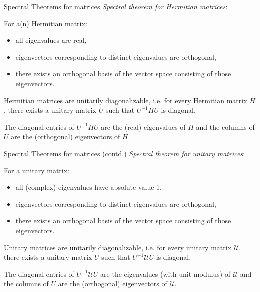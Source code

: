 \documentclass{beamer}
\newcommand\italictext[1]{\textcolor{italics}{\textit{#1}}}
\begin{document}
\begin{frame}{Spectral Theorems for matrices}
    \italictext{Spectral theorem for Hermitian matrices}:
    \begin{theorem}
        For a(n) Hermitian matrix:
        \begin{itemize}
            \item all eigenvalues are real,
            \item eigenvectors corresponding to distinct eigenvalues are orthogonal,
            \item there exists an orthogonal basis of the vector space consisting of those eigenvectors.
        \end{itemize}
    \end{theorem}
    \begin{corollary}
        Hermitian matrices are unitarily diagonalizable, i.e. for every Hermitian matrix $H$, there exists a unitary matrix $U$ such that $U^{-1}HU$ is diagonal.
    \end{corollary}
    The diagonal entries of $U^{-1}HU$ are the (real) eigenvalues of $H$ and the columns of $U$ are the (orthogonal) eigenvectors of $H$.
\end{frame}

\begin{frame}{Spectral Theorems for matrices (contd.)}
    \italictext{Spectral theorem for unitary matrices}:
    \begin{theorem}
        For a unitary matrix:
        \begin{itemize}
            \item all (complex) eigenvalues have absolute value 1,
            \item eigenvectors corresponding to distinct eigenvalues are orthogonal,
            \item there exists an orthogonal basis of the vector space consisting of those eigenvectors.
        \end{itemize}
    \end{theorem}
    \begin{corollary}
        Unitary matrices are unitarily diagonalizable, i.e. for every unitary matrix $\mathcal{U}$, there exists a unitary matrix $U$ such that $U^{-1}\mathcal{U}U$ is diagonal.
    \end{corollary}
    The diagonal entries of $U^{-1}\mathcal{U}U$ are the eigenvalues (with unit modulus) of $\mathcal{U}$ and the columns of $U$ are the (orthogonal) eigenvectors of $\mathcal{U}$.
\end{frame}
\end{document}

